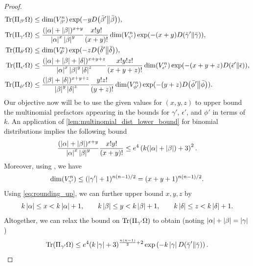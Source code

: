 \documentclass[notitlepage, 10pt]{article}
\begin{document}
\begin{proof}
\begin{align}
        \operatorname{Tr}(\Pi_{\beta'} \Omega)
        &\leq \dim(V_{\beta'}^{n}) \exp(- y D\!\left(\bar \beta'\middle\|\bar \beta\right)), \\
        \operatorname{Tr}(\Pi_{\gamma'} \Omega)
        &\leq \frac{(\left|\alpha\right|+\left|\beta\right|)^{x+y}}{\left|\alpha\right|^{x}\left|\beta\right|^{y}}\frac{x!y!}{(x+y)!}\dim(V_{\gamma'}^{n}) \exp(- (x+y) D\!\left(\bar \gamma'\middle\|\bar \gamma\right)), \\
        \operatorname{Tr}(\Pi_{\delta'} \Omega)
        &\leq \dim(V_{\delta'}^{n}) \exp(- z D\!\left(\bar \delta'\middle\|\bar \delta\right)), \\
        \operatorname{Tr}(\Pi_{\epsilon'} \Omega)
        &\leq \frac{(\left|\alpha\right|+\left|\beta\right|+\left|\delta\right|)^{x+y+z}}{\left|\alpha\right|^{x}\left|\beta\right|^{y}\left|\delta\right|^{z}}\frac{x!y!z!}{(x+y+z)!}\dim(V_{\epsilon'}^{n}) \exp(- (x+y+z) D\!\left(\bar \epsilon'\middle\|\bar \epsilon\right)), \\
        \operatorname{Tr}(\Pi_{\phi'} \Omega)
        &\leq \frac{(\left|\beta\right|+\left|\delta\right|)^{x+y+z}}{\left|\beta\right|^{y}\left|\delta\right|^{z}}\frac{y!z!}{(y+z)!} \dim(V_{\phi'}^{n}) \exp(- (y+z) D\!\left(\bar \phi'\middle\|\bar \phi\right)).
    \end{align}
    Our objective now will be to use the given values for $(x,y,z)$ to upper bound the multinomial prefactors appearing in the bounds for $\gamma'$, $\epsilon'$, and $\phi'$ in terms of $k$.
    An application of \cref{lem:multinomial_dist_lower_bound} for binomial distributions implies the following bound
    \begin{equation}
        \frac{(\left|\alpha\right|+\left|\beta\right|)^{x+y}}{\left|\alpha\right|^{x}\left|\beta\right|^{y}}\frac{x!y!}{(x+y)!}
        \leq e^{4}\left(k (\left|\alpha\right| + \left|\beta\right|)+3\right)^2.
    \end{equation}
    Moreover, using \cite[Equation 7]{christandl2006spectra}, we have
    \begin{equation}
        \dim(V_{\gamma'}^{n}) \leq (\left|\gamma'\right|+1)^{n(n-1)/2} = (x+y+1)^{n(n-1)/2}.
    \end{equation}
    Using \cref{eq:rounding_up}, we can further upper bound $x,y,z$ by 
    \begin{equation}
        k \left|\alpha\right| \leq x < k \left|\alpha\right| + 1,
        \qquad
        k \left|\beta\right| \leq y < k \left|\beta\right| + 1,
        \qquad
        k \left|\delta\right| \leq z < k \left|\delta\right| + 1.
    \end{equation}
    Altogether, we can relax the bound on $\operatorname{Tr}(\Pi_{\gamma'} \Omega)$ to obtain (noting $\left|\alpha\right|+\left|\beta\right|=\left|\gamma\right|$)
    \begin{equation}
        \Tr(\Pi_{\gamma'} \Omega) \leq
        e^{4}(k\abs{\gamma}+3)^{\frac{n(n-1)}{2}+2}\exp\left(-k\abs{\gamma}\kl{\bar \gamma'}{\bar \gamma}\right).

\end{equation}
\end{proof}
\end{document}
